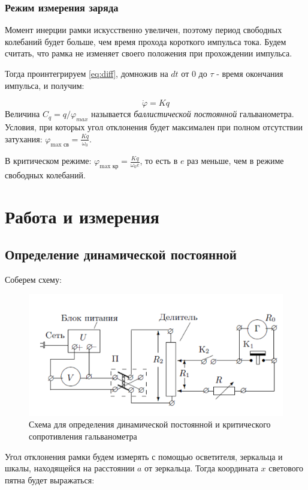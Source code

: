 \documentclass[a4paper, 12pt]{article}
\begin{document}
\subsubsection*{Режим измерения заряда}

Момент инерции рамки искусственно увеличен, поэтому период свободных колебаний будет больше, чем время прохода короткого импульса тока. Будем считать, что рамка не изменяет своего положения при прохождении импульса.

Тогда проинтегрируем \ref{eq:diff}, домножив на $dt$ от $0$ до $\tau$ - время окончания импульса,  и получим:

$$\dot{\varphi} = K q$$
Величина $C_q = q/\varphi_{max}$ называется \textit{баллистической постоянной} гальванометра. Условия, при которых угол отклонения будет максимален при полном отсутствии затухания: $\varphi_\text{max св} = \frac{Kq}{\omega_0}$. 

В критическом режиме: 
$\varphi_\text{max кр} = \frac{Kq}{\omega_0e}$, то есть в $e$ раз меньше, чем в режиме свободных колебаний.

\section{Работа и измерения}


\subsection*{Определение динамической постоянной}

Соберем схему:

	\begin {figure}[H]
		\begin{center}
			\includegraphics[width = 0.8 \textwidth]{Scheme1}
			\caption{Схема для определения динамической постоянной и критического сопротивления гальванометра}
		\end{center}
	\end {figure}

Угол отклонения рамки будем измерять с помощью осветителя, зеркальца и шкалы, находящейся на расстоянии $a$ от зеркальца. Тогда координата $x$ светового пятна будет выражаться:
\end{document}
